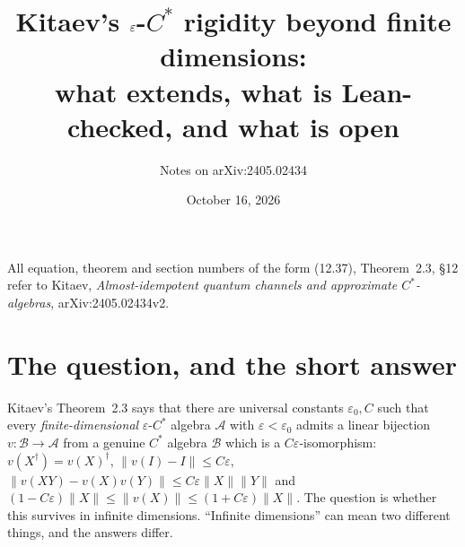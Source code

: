 \documentclass[11pt]{article}
\title{Kitaev's $\eps$-$C^*$ rigidity beyond finite dimensions:\\ what extends, what is Lean-checked, and what is open}
\author{Notes on arXiv:2405.02434}
\date{October 16, 2026}
\theoremstyle{remark}
\newcommand{\eps}{\varepsilon}
\newcommand{\cA}{\mathcal{A}}
\newcommand{\cB}{\mathcal{B}}
\begin{document}
\maketitle

\noindent
All equation, theorem and section numbers of the form (12.37), Theorem~2.3, \S12 refer to Kitaev, \emph{Almost-idempotent quantum channels and approximate $C^*$-algebras}, arXiv:2405.02434v2.

\section{The question, and the short answer}

Kitaev's Theorem~2.3 says that there are universal constants $\eps_0, C$ such that every \emph{finite-dimensional} $\eps$-$C^*$ algebra $\cA$ with $\eps<\eps_0$ admits a linear bijection $v\colon\cB\to\cA$ from a genuine $C^*$ algebra $\cB$ which is a $C\eps$-isomorphism: $v(X^\dagger)=v(X)^\dagger$, $\|v(I)-I\|\le C\eps$, $\|v(XY)-v(X)v(Y)\|\le C\eps\|X\|\|Y\|$ and $(1-C\eps)\|X\|\le\|v(X)\|\le(1+C\eps)\|X\|$. The question is whether this survives in infinite dimensions. ``Infinite dimensions'' can mean two different things, and the answers differ.
\end{document}
